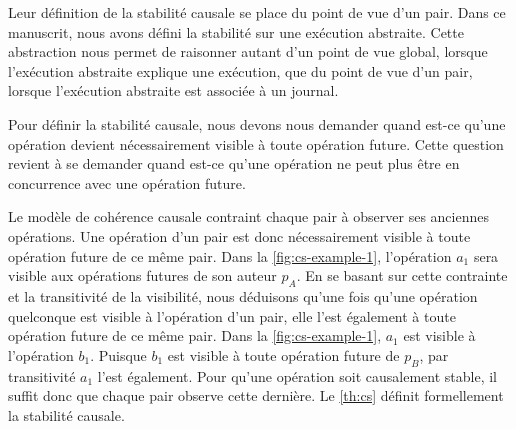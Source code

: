 Leur définition de la stabilité causale se place du point de vue d'un pair.
Dans ce manuscrit, nous avons défini la stabilité sur une exécution abstraite.
Cette abstraction nous permet de raisonner autant d'un point de vue global, lorsque l'exécution abstraite explique une exécution, que du point de vue d'un pair, lorsque l'exécution abstraite est associée à un journal.

Pour définir la stabilité causale, nous devons nous demander quand est-ce qu'une opération devient nécessairement visible à toute opération future.
Cette question revient à se demander quand est-ce qu'une opération ne peut plus être en concurrence avec une opération future.

Le modèle de cohérence causale contraint chaque pair à observer ses anciennes opérations.
Une opération d'un pair est donc nécessairement visible à toute opération future de ce même pair.
Dans la \autoref{fig:cs-example-1}, l'opération $a_1$ sera visible aux opérations futures de son auteur $p_A$.
En se basant sur cette contrainte et la transitivité de la visibilité, nous déduisons qu'une fois qu'une opération quelconque est visible à l'opération d'un pair, elle l'est également à toute opération future de ce même pair.
Dans la \autoref{fig:cs-example-1}, $a_1$ est visible à l'opération $b_1$.
Puisque $b_1$ est visible à toute opération future de $p_B$, par transitivité $a_1$ l'est également.
Pour qu'une opération soit causalement stable, il suffit donc que chaque pair observe cette dernière.
Le \autoref{th:cs} définit formellement la stabilité causale.

